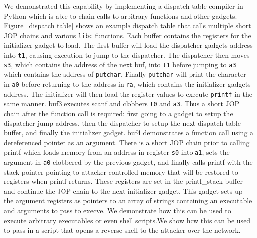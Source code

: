 We demonstrated this capability by implementing a dispatch table compiler in
Python which is able to chain calls to arbitrary functions and other gadgets.
Figure~\ref{dispatch table} shows an example dispatch table that calls multiple
short JOP chains and various \verb|libc| functions. Each buffer contains the
registers for the initializer gadget to load. The first buffer will load
the dispatcher gadgets address into \verb|t1|, causing execution to jump to
the dispatcher. The dispatcher then moves \verb|s3|, which contains the address
of the next buf, into \verb|t1| before jumping to \verb|a3| which contains
the address of \verb|putchar|. Finally \verb|putchar| will print the character
in \verb|a0| before returning to the address in \verb|ra|, which contains the
initializer gadgets address. The initializer will then load the register values
to execute \verb|printf| in the same manner. buf3 executes scanf and clobbers
\verb|t0| and \verb|a3|. Thus a short JOP chain after the function call is
required: first going to a gadget to setup the dispatcher jump address,
then the dispatcher to setup the next dispatch table buffer, and finally the
initializer gadget. buf4 demonstrates a function call using a dereferenced
pointer as an argument. There is a short JOP chain prior to calling
printf which loads memory from an address in register \verb|s0| into \verb|a1|,
sets the argument in \verb|a0| clobbered by the previous gadget, and finally
calls printf with the stack pointer pointing to attacker controlled memory
that will be restored to registers when printf returns. These registers
are set in the printf\_stack buffer and continue the JOP chain to the next
initializer gadget. This gadget sets up the argument registers as pointers
to an array of strings containing an executable and arguments to pass to
execve. We demonstrate how this can be used to execute arbitrary executables
or even shell scripts.We show how this can be used to pass in a script that
opens a reverse-shell to the attacker over the network.

